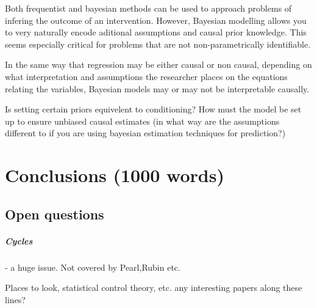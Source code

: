 \documentclass[11pt,a4paper,oneside]{book}
\begin{document}
Both frequentist and bayesian methods can be used to approach problems of infering the outcome of an intervention. However, Bayesian modelling allows you to very naturally encode aditional assumptions and causal prior knowledge. This seems especially critical for problems that are not non-parametrically identifiable. 

In the same way that regression may be either causal or non causal, depending on what interpretation and assumptions the researcher places on the equations relating the variables, Bayesian models may or may not be interpretable causally.  

Is setting certain priors equivelent to conditioning? How must the model be set up to ensure unbiased causal estimates (in what way are the assumptions different to if you are using bayesian estimation techniques for prediction?)

\chapter*{Conclusions (1000 words)}

\section*{Open questions}
\paragraph{Cycles} - a huge issue. Not covered by Pearl,Rubin etc. 

Places to look, statistical control theory, etc. any interesting papers along these lines?


\end{document}
